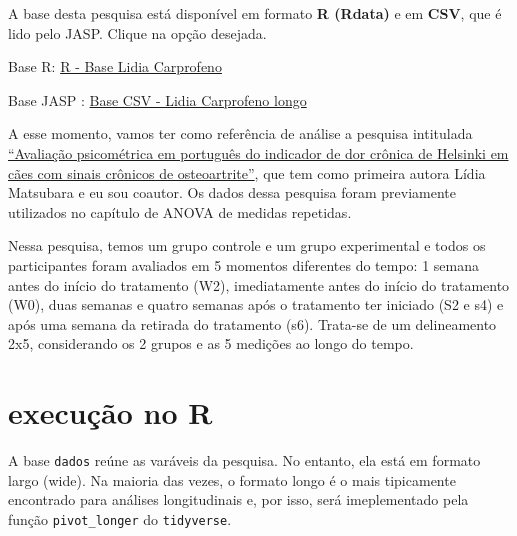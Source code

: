 \documentclass[
]{book}
\newenvironment{base}{
  \definecolor{shadecolor}{rgb}{0.764,0.992,0.686}  %
  \color{black}
  \begin{shaded}}
 {\end{shaded}}
\begin{document}
\begin{base}
A base desta pesquisa está disponível em formato \textbf{R (Rdata)} e em \textbf{CSV}, que é lido pelo JASP. Clique na opção desejada.

Base R: \href{https://github.com/anovabr/mqt/raw/master/bases/R\%20-\%20Base\%20Lidia\%20Carprofeno.RData}{R - Base Lidia Carprofeno}

Base JASP : \href{https://github.com/anovabr/mqt/raw/master/bases/bases_csv_jasp.zip}{Base CSV - Lidia Carprofeno longo}

\end{base}

A esse momento, vamos ter como referência de análise a pesquisa intitulada \href{https://www.scielo.br/scielo.php?script=sci_arttext\&pid=S0102-09352019000100109}{``Avaliação psicométrica em português do indicador de dor crônica de Helsinki em cães com sinais crônicos de osteoartrite''}, que tem como primeira autora Lídia Matsubara e eu sou coautor. Os dados dessa pesquisa foram previamente utilizados no capítulo de ANOVA de medidas repetidas.

Nessa pesquisa, temos um grupo controle e um grupo experimental e todos os participantes foram avaliados em 5 momentos diferentes do tempo: 1 semana antes do início do tratamento (W2), imediatamente antes do início do tratamento (W0), duas semanas e quatro semanas após o tratamento ter iniciado (S2 e s4) e após uma semana da retirada do tratamento (s6). Trata-se de um delineamento 2x5, considerando os 2 grupos e as 5 medições ao longo do tempo.

\hypertarget{execuuxe7uxe3o-no-r-12}{%
\section{execução no R}\label{execuuxe7uxe3o-no-r-12}}

A base \texttt{dados} reúne as varáveis da pesquisa. No entanto, ela está em formato largo (wide). Na maioria das vezes, o formato longo é o mais tipicamente encontrado para análises longitudinais e, por isso, será imeplementado pela função \texttt{pivot\_longer} do \texttt{tidyverse}.
\end{document}
